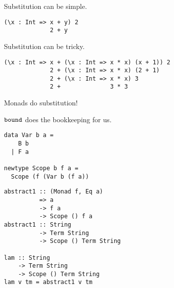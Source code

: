 \documentclass{beamer}
\begin{document}
\begin{frame}[fragile]
  \begin{center}
   Substitution can be simple.
  \end{center}
  \begin{verbatim}
(\x : Int => x + y) 2
             2 + y
  \end{verbatim}  
\end{frame}

\begin{frame}[fragile]
  \begin{center}
   Substitution can be tricky.
  \end{center}
  \begin{verbatim}
(\x : Int => x + (\x : Int => x * x) (x + 1)) 2
             2 + (\x : Int => x * x) (2 + 1)
             2 + (\x : Int => x * x) 3
             2 +              3 * 3
  \end{verbatim}  
\end{frame}

\begin{frame}[fragile]
  \begin{center}
    Monads do substitution!
  \end{center}
\end{frame}

\begin{frame}[fragile]
  \begin{center}
    $\tt{bound}$ does the bookkeeping for us.
  \end{center}
\end{frame}

\begin{frame}[fragile]
  \begin{verbatim}
data Var b a = 
    B b 
  | F a

newtype Scope b f a = 
  Scope (f (Var b (f a))
  \end{verbatim}  
\end{frame}

\begin{frame}[fragile]
  \begin{verbatim}
abstract1 :: (Monad f, Eq a) 
          => a 
          -> f a 
          -> Scope () f a
abstract1 :: String 
          -> Term String 
          -> Scope () Term String

lam :: String 
    -> Term String 
    -> Scope () Term String
lam v tm = abstract1 v tm
  \end{verbatim}  
\end{frame}
\end{document}
